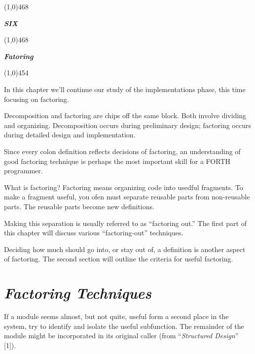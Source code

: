 \documentclass{book}
\begin{document}
\noindent
\line(1,0){468} \newline
\begin{Huge}
\textbf{\textit{SIX}}
\end{Huge}
\newline \noindent
\line(1,0){468}

\bigskip \bigskip
\begin{Huge}
\textbf{\textit{Fatoring}}
\end{Huge}
\newpage

\line(1,0){454} 

\noindent
In this chapter we'll continue our study of the implementations phase, this time focusing on factoring.

Decomposition and factoring are chips off the same block. Both involve dividing and organizing. Decomposition occurs during preliminary design; factoring occurs during detailed design and implementation.

Since every colon definition reflects decisions of factoring, an understanding of good factoring technique is perhaps the most important skill for a FORTH programmer.

What is factoring? Factoring means organizing code into usedful fragments. To make a fragment useful, you ofen must separate reusable parts from non-reusable parts. The reusable parts become new definitions.

Making this separation is usually referred to as ``factoring out.'' The first part of this chapter will discuss various ``factoring-out'' techniques.

Deciding how much should go into, or stay out of, a definition is another aspect of factoring. The second section will outline the criteria for useful factoring.

\section*{
	\textbf{
		\textit{Factoring Techniques}}}

\setlength{\parindent}{10mm}
  
\begin{list}{}{}

\item
If a module seems almost, but not quite, useful form a second place in the system, try to identify and isolate the useful subfunction. The remainder of the module might be incorporated in its original caller (from ``\textit{Structured Design}'' [1]).

\end{list}{}{}
\end{document}
